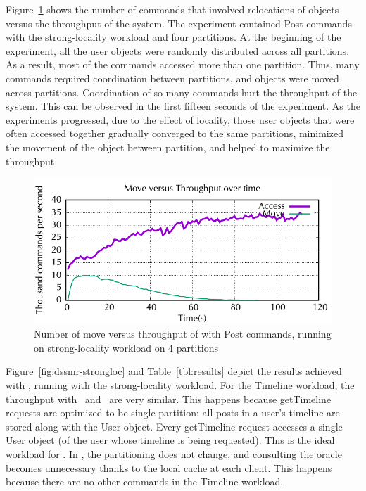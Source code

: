 Figure~\ref{fig:dssmr-move-vs-tp-strong} shows the number of commands that
involved relocations of objects versus the throughput of the system.
The experiment contained Post commands with the strong-locality workload and four
partitions. At the beginning of the experiment, all the user
objects were randomly distributed across all partitions. As a result, most of the
commands accessed more than one partition. Thus, many commands required
coordination between partitions, and objects were moved across partitions. 
Coordination of so many commands hurt the throughput of the system. This can be observed in the
first fifteen seconds of the experiment. As the experiments progressed, due to the
effect of locality, those user objects that were often accessed together
gradually converged to the same partitions, minimized the movement of the object
between partition, and helped to maximize the throughput.


\begin{figure}[ht!]
\begin{minipage}[b]{1\linewidth}
\centering
      \includegraphics[width=0.6\linewidth]{figures/experiments/dssmr/move-vs-throughput}
\end{minipage}
\caption{Number of move versus throughput of \dynastar with Post commands, running on strong-locality workload on 4 partitions}
\label{fig:dssmr-move-vs-tp-strong}
\end{figure}


Figure~\ref{fig:dssmr-strongloc} and Table~\ref{tbl:results} depict the
results achieved with \dssmrappname{}, running with the strong-locality workload.
For the Timeline workload, the throughput with \dssmr\ and \ssmr\ are very
similar. This happens because getTimeline requests are optimized to be
single-partition: all posts in a user's timeline are stored along with the User
object. Every getTimeline request accesses a single User object (of the user
whose timeline is being requested). This is the ideal workload for \ssmr{}. In
\dssmr{}, the partitioning does not change, and consulting the oracle becomes
unnecessary thanks to the local cache at each client. This happens because there
are no other commands in the Timeline workload.

